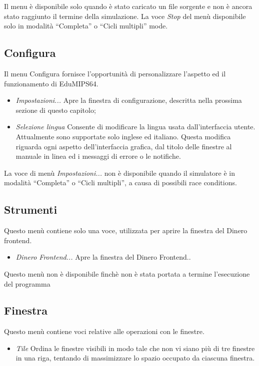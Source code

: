 \documentclass[letterpaper,10pt,italian]{sphinxmanual}
\begin{document}
Il menu è disponibile solo quando è stato caricato un file sorgente e
non è ancora stato raggiunto il termine della simulazione.  La voce
\emph{Stop} del menù  disponibile solo in modalità ``Completa'' o
``Cicli multipli'' mode.


\subsection{Configura}
\label{user-interface:configura}
Il menu Configura fornisce l'opportunità di personalizzare l'aspetto ed il
funzionamento di EduMIPS64.
\begin{itemize}
\item {} 
\emph{Impostazioni...} Apre la finestra di configurazione, descritta nella
prossima sezione di questo capitolo;

\item {} 
\emph{Selezione lingua} Consente di modificare la lingua usata
dall'interfaccia utente. Attualmente sono supportate solo inglese ed
italiano. Questa modifica riguarda ogni aspetto dell'interfaccia grafica,
dal titolo delle finestre al manuale in linea ed i messaggi di errore o le
notifiche.

\end{itemize}

La voce di menù \emph{Impostazioni...} non è disponibile quando il
simulatore è in modalità ``Completa'' o ``Cicli multipli'', a causa di
possibili race conditions.


\subsection{Strumenti}
\label{user-interface:strumenti}
Questo menù contiene solo una voce, utilizzata per aprire la finestra del
Dinero frontend.
\begin{itemize}
\item {} 
\emph{Dinero Frontend...} Apre la finestra del Dinero Frontend..

\end{itemize}

Questo menù non è disponibile finchè non è stata portata a
termine l'esecuzione del programma


\subsection{Finestra}
\label{user-interface:finestra}
Questo menù contiene voci relative alle operazioni con le finestre.
\begin{itemize}
\item {} 
\emph{Tile} Ordina le finestre visibili in modo tale che non vi siano
più di tre finestre in una riga, tentando di massimizzare lo spazio
occupato da ciascuna finestra.

\end{itemize}
\end{document}
